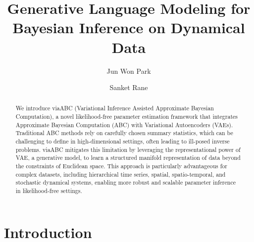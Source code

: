 \documentclass[12pt]{article} %
\begin{document}
\title{Generative Language Modeling for Bayesian Inference on Dynamical Data}
\author[1]{Jun Won Park}
\author[1]{Sanket Rane}

\maketitle
%
%
%
%
%
\begin{abstract}
We introduce viaABC (Variational Inference Assisted Approximate Bayesian Computation), a novel likelihood-free parameter estimation framework that integrates Approximate Bayesian Computation (ABC) with Variational Autoencoders (VAEs). Traditional ABC methods rely on carefully chosen summary statistics, which can be challenging to define in high-dimensional settings, often leading to ill-posed inverse problems. viaABC mitigates this limitation by leveraging the representational power of VAE, a generative model, to learn a structured manifold representation of data beyond the constraints of Euclidean space. This approach is particularly advantageous for complex datasets, including hierarchical time series, spatial, spatio-temporal, and stochastic dynamical systems, enabling more robust and scalable parameter inference in likelihood-free settings.
\end{abstract}

\section{Introduction}
\end{document}
